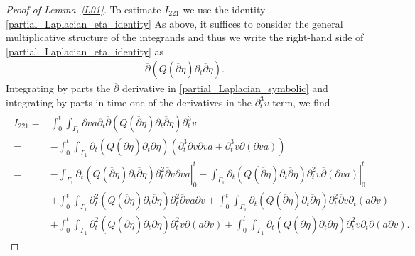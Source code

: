 \documentclass[10pt,reqno]{amsart}
\theoremstyle{plain}
\theoremstyle{definition}
\numberwithin{equation}{section}
\newcommand{\Ga}{\Gamma}
\begin{document}
\begin{proof}[Proof of Lemma~\ref{L01}]
To estimate $ I_{221}$ we use the identity \eqref{partial_Laplacian_eta_identity} 
As above, it suffices to consider the general
multiplicative structure of the integrands and thus we write the right-hand side 
of \eqref{partial_Laplacian_eta_identity} as
\begin{gather}
 \overline{\partial} (Q(\overline{\partial} \eta) \partial_t \overline{\partial} \eta ).
\label{partial_Laplacian_symbolic}
\end{gather}
Integrating by parts the $\overline{\partial}$ derivative in 
\eqref{partial_Laplacian_symbolic} and integrating by parts in time one of the derivatives
in the $\partial^3_t v$ term, we find
\begin{align}
\begin{split}
I_{221} = & 
\int_0^t \int_{\Ga_1} 
{\partial}v a 
\partial_t  \overline{\partial} (Q(\overline{\partial} \eta) \partial_t \overline{\partial} \eta )
\partial^3_t v
\\
= &
-\int_0^t \int_{\Ga_1} 
\partial_t  (Q(\overline{\partial} \eta) \partial_t \overline{\partial} \eta )
( \partial^3_t \overline{\partial} v {\partial} v a 
+ 
\partial^3_t v \overline{\partial} ( {\partial} v a ) )
\\
= &
-\left.
\int_{\Ga_1} 
\partial_t  (Q(\overline{\partial} \eta) \partial_t \overline{\partial} \eta )
\partial^2_t \overline{\partial} v {\partial} v a 
\right|_0^t
- \left.
\int_{\Ga_1} 
 \partial_t  (Q(\overline{\partial} \eta) \partial_t \overline{\partial} \eta )
\partial^2_t v \overline{\partial} ( {\partial} v a ) 
\right|_0^t
\\
&+
\int_0^t \int_{\Ga_1} 
 \partial^2_t  (Q(\overline{\partial} \eta) \partial_t \overline{\partial} \eta )
 \partial^2_t \overline{\partial} v a {\partial} v
 +
 \int_0^t \int_{\Ga_1} 
 \partial_t  (Q(\overline{\partial} \eta) \partial_t \overline{\partial} \eta )
 \partial^2_t \overline{\partial} v \partial_t (a {\partial} v)
 \\
 & 
 +
 \int_0^t \int_{\Ga_1} 
 \partial^2_t  (Q(\overline{\partial} \eta) \partial_t \overline{\partial} \eta )
 \partial^2_t  v  \overline{\partial}( a {\partial} v)
 +
 \int_0^t \int_{\Ga_1} 
 \partial_t  (Q(\overline{\partial} \eta) \partial_t \overline{\partial} \eta )
 \partial^2_t  v \partial_t \overline{\partial} (a {\partial} v)
   .
\end{split}
\nonumber
\end{align}

\end{proof}
\end{document}
